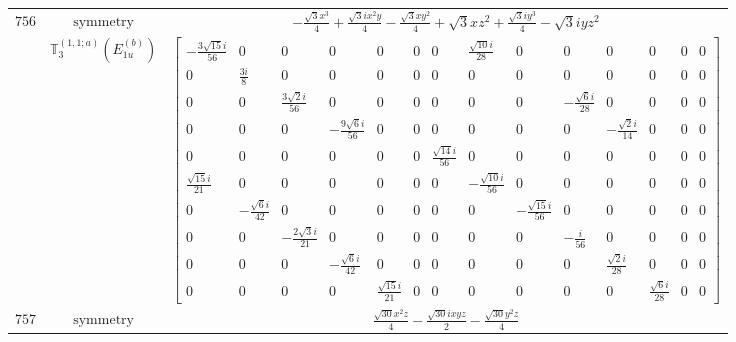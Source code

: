 \documentclass[fleqn,8pt,landscape]{jsarticle}
\begin{document}
\begin{longtable}{ccc}
$ 756 $ & $ \text{symmetry} $ & $ - \frac{\sqrt{3} x^{3}}{4} + \frac{\sqrt{3} i x^{2} y}{4} - \frac{\sqrt{3} x y^{2}}{4} + \sqrt{3} x z^{2} + \frac{\sqrt{3} i y^{3}}{4} - \sqrt{3} i y z^{2} $ \\
$  $ & $ \mathbb{T}_{3}^{(1,1;a)}(E_{1u}^{(b)}) $ & $ \begin{bmatrix} - \frac{3 \sqrt{15} i}{56} & 0 & 0 & 0 & 0 & 0 & 0 & \frac{\sqrt{10} i}{28} & 0 & 0 & 0 & 0 & 0 & 0 \\ 0 & \frac{3 i}{8} & 0 & 0 & 0 & 0 & 0 & 0 & 0 & 0 & 0 & 0 & 0 & 0 \\ 0 & 0 & \frac{3 \sqrt{2} i}{56} & 0 & 0 & 0 & 0 & 0 & 0 & - \frac{\sqrt{6} i}{28} & 0 & 0 & 0 & 0 \\ 0 & 0 & 0 & - \frac{9 \sqrt{6} i}{56} & 0 & 0 & 0 & 0 & 0 & 0 & - \frac{\sqrt{2} i}{14} & 0 & 0 & 0 \\ 0 & 0 & 0 & 0 & 0 & 0 & \frac{\sqrt{14} i}{56} & 0 & 0 & 0 & 0 & 0 & 0 & 0 \\ \frac{\sqrt{15} i}{21} & 0 & 0 & 0 & 0 & 0 & 0 & - \frac{\sqrt{10} i}{56} & 0 & 0 & 0 & 0 & 0 & 0 \\ 0 & - \frac{\sqrt{6} i}{42} & 0 & 0 & 0 & 0 & 0 & 0 & - \frac{\sqrt{15} i}{56} & 0 & 0 & 0 & 0 & 0 \\ 0 & 0 & - \frac{2 \sqrt{3} i}{21} & 0 & 0 & 0 & 0 & 0 & 0 & - \frac{i}{56} & 0 & 0 & 0 & 0 \\ 0 & 0 & 0 & - \frac{\sqrt{6} i}{42} & 0 & 0 & 0 & 0 & 0 & 0 & \frac{\sqrt{2} i}{28} & 0 & 0 & 0 \\ 0 & 0 & 0 & 0 & \frac{\sqrt{15} i}{21} & 0 & 0 & 0 & 0 & 0 & 0 & \frac{\sqrt{6} i}{28} & 0 & 0 \end{bmatrix} $ \\ \hline
$ 757 $ & $ \text{symmetry} $ & $ \frac{\sqrt{30} x^{2} z}{4} - \frac{\sqrt{30} i x y z}{2} - \frac{\sqrt{30} y^{2} z}{4} $ \\

\end{longtable}
\end{document}
